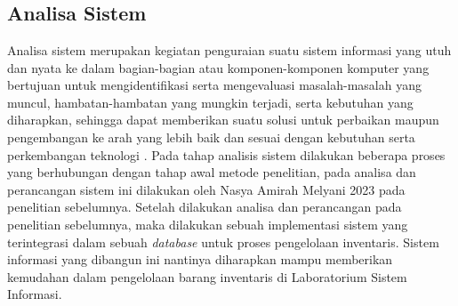 %


%


\chapter{\babEmpat}
\section{Analisa Sistem}
Analisa sistem merupakan kegiatan penguraian suatu sistem informasi yang utuh dan nyata ke dalam bagian-bagian atau komponen-komponen komputer yang bertujuan untuk mengidentifikasi serta mengevaluasi masalah-masalah yang muncul, hambatan-hambatan yang mungkin terjadi, serta kebutuhan yang diharapkan, sehingga dapat memberikan suatu solusi untuk perbaikan maupun pengembangan ke arah yang lebih baik dan sesuai dengan kebutuhan serta perkembangan teknologi \cite{nugraha2014analisa}. Pada tahap analisis sistem dilakukan beberapa proses yang berhubungan dengan tahap awal metode penelitian, pada analisa dan perancangan sistem ini dilakukan oleh Nasya Amirah Melyani 2023 pada penelitian sebelumnya.
Setelah dilakukan analisa dan perancangan pada penelitian sebelumnya, maka dilakukan sebuah implementasi sistem yang terintegrasi dalam sebuah \textit{database} untuk proses pengelolaan inventaris. Sistem informasi yang dibangun ini nantinya diharapkan mampu memberikan kemudahan dalam pengelolaan barang inventaris di Laboratorium Sistem Informasi.

